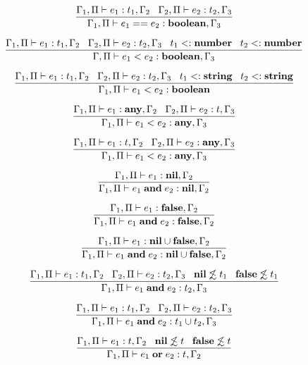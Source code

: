 \[
\dfrac{\Gamma_{1}, \Pi \vdash e_{1}:t_{1}, \Gamma_{2} \;\;\;
       \Gamma_{2}, \Pi \vdash e_{2}:t_{2}, \Gamma_{3}}
      {\Gamma_{1}, \Pi \vdash e_{1} == e_{2}:\mathbf{boolean}, \Gamma_{3}}
\]

\[
\dfrac{\Gamma_{1}, \Pi \vdash e_{1}:t_{1}, \Gamma_{2} \;\;\;
       \Gamma_{2}, \Pi \vdash e_{2}:t_{2}, \Gamma_{3} \;\;\;
       t_{1} <: \mathbf{number} \;\;\;
       t_{2} <: \mathbf{number}}
      {\Gamma, \Pi \vdash e_{1} < e_{2}:\mathbf{boolean}, \Gamma_{3}}
\]

\[
\dfrac{\Gamma_{1}, \Pi \vdash e_{1}:t_{1}, \Gamma_{2} \;\;\;
       \Gamma_{2}, \Pi \vdash e_{2}:t_{2}, \Gamma_{3} \;\;\;
       t_{1} <: \mathbf{string} \;\;\;
       t_{2} <: \mathbf{string}}
      {\Gamma_{1}, \Pi \vdash e_{1} < e_{2}:\mathbf{boolean}}
\]

\[
\dfrac{\Gamma_{1}, \Pi \vdash e_{1}:\mathbf{any}, \Gamma_{2} \;\;\;
       \Gamma_{2}, \Pi \vdash e_{2}:t, \Gamma_{3}}
      {\Gamma_{1}, \Pi \vdash e_{1} < e_{2}:\mathbf{any}, \Gamma_{3}}
\]

\[
\dfrac{\Gamma_{1}, \Pi \vdash e_{1}:t, \Gamma_{2} \;\;\;
       \Gamma_{2}, \Pi \vdash e_{2}:\mathbf{any}, \Gamma_{3}}
      {\Gamma_{1}, \Pi \vdash e_{1} < e_{2}:\mathbf{any}, \Gamma_{3}}
\]

\[
\dfrac{\Gamma_{1}, \Pi \vdash e_{1}:\mathbf{nil}, \Gamma_{2}}
      {\Gamma_{1}, \Pi \vdash e_{1} \; \mathbf{and} \; e_{2}:\mathbf{nil}, \Gamma_{2}}
\]

\[
\dfrac{\Gamma_{1}, \Pi \vdash e_{1}:\mathbf{false}, \Gamma_{2}}
      {\Gamma_{1}, \Pi \vdash e_{1} \; \mathbf{and} \; e_{2}:\mathbf{false}, \Gamma_{2}}
\]

\[
\dfrac{\Gamma_{1}, \Pi \vdash e_{1}:\mathbf{nil} \cup \mathbf{false}, \Gamma_{2}}
      {\Gamma_{1}, \Pi \vdash e_{1} \; \mathbf{and} \; e_{2}:\mathbf{nil} \cup \mathbf{false}, \Gamma_{2}}
\]

\[
\dfrac{\Gamma_{1}, \Pi \vdash e_{1}:t_{1}, \Gamma_{2} \;\;\;
       \Gamma_{2}, \Pi \vdash e_{2}:t_{2}, \Gamma_{3} \;\;\;
       \mathbf{nil} \not\lesssim t_{1} \;\;\;
       \mathbf{false} \not\lesssim t_{1}}
      {\Gamma_{1}, \Pi \vdash e_{1} \; \mathbf{and} \; e_{2}:t_{2}, \Gamma_{3}}
\]

\[
\dfrac{\Gamma_{1}, \Pi \vdash e_{1}:t_{1}, \Gamma_{2} \;\;\;
       \Gamma_{2}, \Pi \vdash e_{2}:t_{2}, \Gamma_{3}}
      {\Gamma_{1}, \Pi \vdash e_{1} \; \mathbf{and} \; e_{2}:t_{1} \cup t_{2}, \Gamma_{3}}
\]

\[
\dfrac{\Gamma_{1}, \Pi \vdash e_{1}:t, \Gamma_{2} \;\;\;
       \mathbf{nil} \not\lesssim t \;\;\;
       \mathbf{false} \not\lesssim t}
      {\Gamma_{1}, \Pi \vdash e_{1} \; \mathbf{or} \; e_{2}:t, \Gamma_{2}}
\]

